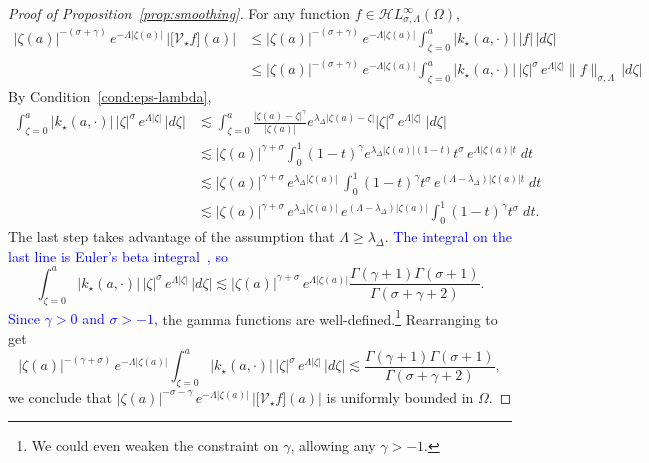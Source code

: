 \documentclass[review]{siamart220329}
\newcommand{\singexp}[2]{\mathcal{H}L^\infty_{#1, #2}}
\newcommand{\softpart}{\mathcal{V}_\star}
\newcommand{\softker}{k_\star}
\newcommand{\domain}{\Omega}
\begin{document}
\begin{proof}[Proof of Proposition~\ref{prop:smoothing}]
For any function $f\in\singexp{\sigma}{\Lambda}(\domain)$,
\begin{align*}
|\zeta(a)|^{-(\sigma+\gamma)} \, e^{-\Lambda |\zeta(a)|} \, \Big \vert \big[ \softpart f\big](a)\Big\vert
&\leq |\zeta(a)|^{-(\sigma+\gamma)}\, e^{-\Lambda |\zeta(a)|} \int_{\zeta=0}^a |\softker(a,\cdot)|\, |f| \, |d\zeta| \\
&\leq |\zeta(a)|^{-(\sigma+\gamma)}\, e^{-\Lambda |\zeta(a)|} \int_{\zeta=0}^a |\softker(a,\cdot)|\, |\zeta|^{\sigma}\, e^{\Lambda |\zeta|} \|f\|_{\sigma,\Lambda} \, |d\zeta| 
\end{align*}
By Condition~\eqref{cond:eps-lambda},
\begin{align*}
\int_{\zeta=0}^a |\softker(a,\cdot)|\, |\zeta|^{\sigma}\, e^{\Lambda |\zeta|} \, |d\zeta| &\lesssim \int_{\zeta=0}^a \frac{|\zeta(a)-\zeta|^\gamma}{|\zeta(a)|} e^{\lambda_\Delta |\zeta(a)-\zeta|} |\zeta|^{\sigma}\, e^{\Lambda|\zeta|}\;|d\zeta|\\
&\lesssim |\zeta(a)|^{\gamma+\sigma} \int_{0}^1 (1-t)^\gamma e^{\lambda_\Delta |\zeta(a)|(1-t)} t^{\sigma}\, e^{\Lambda|\zeta(a)| t}\;dt\\
&\lesssim |\zeta(a)|^{\gamma+\sigma}\, e^{\lambda_\Delta |\zeta(a)|}\,  \int_{0}^1 (1-t)^\gamma  t^{\sigma}\,e^{(\Lambda-\lambda_\Delta)|\zeta(a)| t}\;dt\\
&\lesssim |\zeta(a)|^{\gamma+\sigma}\, e^{\lambda_\Delta |\zeta(a)|}\,e^{(\Lambda-\lambda_\Delta)|\zeta(a)|}\int_{0}^1 (1-t)^\gamma  t^{\sigma}\;dt.
\end{align*}
The last step takes advantage of the assumption that $\Lambda \ge \lambda_\Delta$. \textcolor{blue}{The integral on the last line is Euler's beta integral~\cite[equation~5.12.1]{dlmf}, so}
\[ \int_{\zeta=0}^a |\softker(a,\cdot)|\, |\zeta|^{\sigma}\, e^{\Lambda |\zeta|} \, |d\zeta| \lesssim |\zeta(a)|^{\gamma+\sigma}\, e^{\Lambda |\zeta(a)|} \frac{\Gamma(\gamma+1)\Gamma(\sigma+1)}{\Gamma(\sigma+\gamma+2)}. \]
\textcolor{blue}{Since $\gamma > 0$ and $\sigma > -1$,} the gamma functions are well-defined.\footnote{We could even weaken the constraint on $\gamma$, allowing any $\gamma > -1$.} Rearranging to get
\[ |\zeta(a)|^{-(\gamma+\sigma)}\, e^{-\Lambda |\zeta(a)|} \int_{\zeta=0}^a |\softker(a,\cdot)|\, |\zeta|^{\sigma}\, e^{\Lambda |\zeta|} \, |d\zeta| \lesssim \frac{\Gamma(\gamma+1)\Gamma(\sigma+1)}{\Gamma(\sigma+\gamma+2)}, \]
we conclude that $|\zeta(a)|^{-\sigma-\gamma} \, e^{-\Lambda |\zeta(a)|} \, \Big \vert \big[ \softpart f\big](a)\Big\vert$ is uniformly bounded in $\domain$. 
\end{proof}
\end{document}
